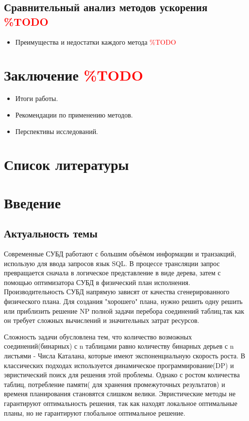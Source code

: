 \documentclass[12pt]{article}
\begin{document}
\begin{flushleft}
\subsection{Сравнительный анализ методов ускорения \textcolor{red}{\%TODO}}
\begin{itemize}
    \item Преимущества и недостатки каждого метода \textcolor{red}{\%TODO}
\end{itemize}

\section{Заключение \textcolor{red}{\%TODO}} 
\begin{itemize}
    \item Итоги работы.
    \item Рекомендации по применению методов.
    \item Перспективы исследований.
\end{itemize}

\section{Список литературы}
\newpage
\centering    \section*{Введение}
\centering    \subsection*{Актуальность темы}
\raggedright
Современные СУБД работают с большим объёмом информации и транзакций, использую для ввода запросов язык SQL. 
В процессе трансляции запрос превращается сначала в логическое представление в виде дерева, 
затем с помощью оптимизатора СУБД в физический план исполнения. Производительность СУБД напрямую зависят от качества
сгенерированного физического плана. Для создания "хорошего" плана, нужно решить одну решить или приблизить решение
NP полной задачи перебора соединений таблиц,так как он требует сложных вычислений и значительных затрат ресурсов.

Сложность задачи обусловлена тем, что количество возможных соединений(бинарных) с n таблицами
равно количеству бинарных дерьев с n листьями - Числа Каталана, которые
имеют экспоненциальную скорость роста.
В классических подходах используется динамическое программирование(DP)
и эвристический поиск для решения этой проблемы. Однако с ростом количества таблиц,
потребление памяти( для хранения промежуточных результатов) и временя планирования становятся
слишком велики. Эвристические методы не гарантируют оптимальность решения, так как
находят локальное оптимальные планы, но не гарантируют глобальное оптимальное решение.


\end{flushleft}
\end{document}
